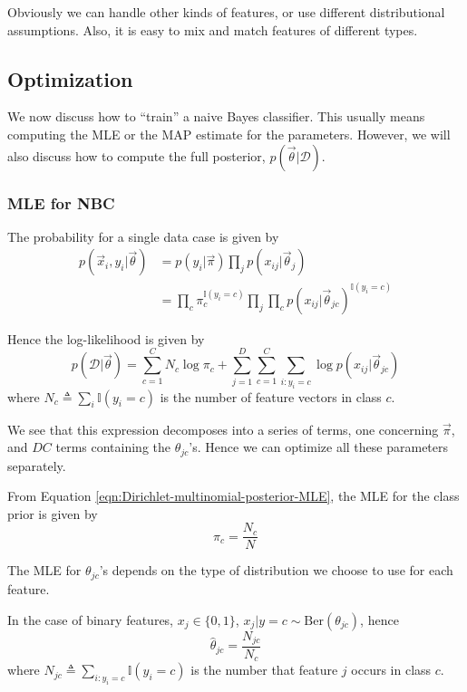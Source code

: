 Obviously we can handle other kinds of features, or use different distributional assumptions. Also, it is easy to mix and match features of different types.


\subsection{Optimization}
\label{sec:NBC-Optimization}
We now discuss how to “train” a naive Bayes classifier. This usually means computing the MLE or the MAP estimate for the parameters. However, we will also discuss how to compute the full posterior, $p(\vec{\theta}|\mathcal{D})$.

\subsubsection{MLE for NBC}
The probability for a single data case is given by
\begin{equation}\begin{split}
p(\vec{x}_i,y_i|\vec{\theta}) & =p(y_i|\vec{\pi})\prod\limits_j p(x_{ij}|\vec{\theta}_j) \\
  & =\prod\limits_c \pi_c^{\mathbb{I}(y_i=c)} \prod\limits_j\prod\limits_c p(x_{ij}|\vec{\theta}_{jc})^{\mathbb{I}(y_i=c)}
\end{split}\end{equation}

Hence the log-likelihood is given by
\begin{equation}
p(\mathcal{D}|\vec{\theta})=\sum\limits_{c=1}^C{N_c\log\pi_c}+ \sum\limits_{j=1}^D{\sum\limits_{c=1}^C{\sum\limits_{i:y_i=c}{\log p(x_{ij}|\vec{\theta}_{jc})}}}
\end{equation}
where $N_c \triangleq \sum\limits_i \mathbb{I}(y_i=c)$ is the number of feature vectors in class $c$.

We see that this expression decomposes into a series of terms, one concerning $\vec{\pi}$, and $DC$ terms containing the $\theta_{jc}$’s. Hence we can optimize all these parameters separately.

From Equation \ref{eqn:Dirichlet-multinomial-posterior-MLE}, the MLE for the class prior is given by
\begin{equation}
\hat{\pi}_c=\dfrac{N_c}{N}
\end{equation}

The MLE for $\theta_{jc}$’s depends on the type of distribution we choose to use for each feature. 

In the case of binary features, $x_j \in \{0,1\}$, $x_j|y=c \sim \text{Ber}(\theta_{jc})$, hence
\begin{equation}
\hat{\theta}_{jc}=\dfrac{N_{jc}}{N_c}
\end{equation}
where $N_{jc} \triangleq \sum\limits_{i:y_i=c} \mathbb{I}(y_i=c)$ is the number that feature $j$ occurs in class $c$.

